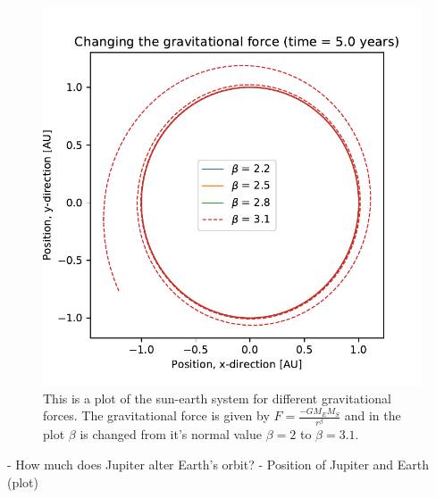 \begin{figure}[H]
\includegraphics[width=1.1\linewidth]{../results/plots/diffenrent_gravitation.pdf}\caption{This is a plot of the sun-earth system for different gravitational forces. The gravitational force is given by $ F = \frac{-GM_EM_S}{r^\beta}$ and in the plot $\beta$ is changed from it's normal value $\beta = 2$ to $\beta = 3.1$.}\label{fig:different_gravitation}
\end{figure}

	- How much does Jupiter alter Earth's orbit?
	- Position of Jupiter and Earth (plot)	
	
